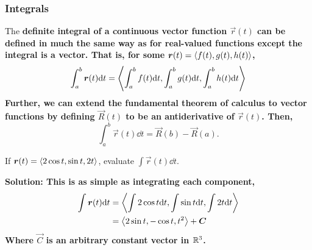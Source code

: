 \subsubsection{Integrals}
The \bf{definite integral} of a continuous vector function \(\vec r(t)\) can be defined in much the same way as for real-valued functions except the integral is a vector. That is, for some \(\boldsymbol{r}(t) = \left\langle f(t), g(t), h(t)\right\rangle\),
\[ \int_a^b\boldsymbol{r}(t)\dd t = \left\langle\int_a^bf(t)\dd t, \int_a^b g(t)\dd t, \int_a^b h(t)\dd t\right\rangle \]
Further, we can extend the fundamental theorem of calculus to vector functions by defining \(\vec R(t)\) to be an antiderivative of \(\vec r(t)\). Then,
\[ \int_a^b\vec r(t)\dd t = \vec R(b) - \vec R(a).\]
\begin{example}
    If \(\boldsymbol{r}(t) = \left\langle2\cos t, \sin t, 2t\right\rangle\), evaluate \(\int \vec r(t)\dd t\).\par\bf{Solution: }This is as simple as integrating each component,
    \begin{align*}
        \int \boldsymbol{r}(t)\dd t &= \left\langle\int 2\cos t \dd t, \int \sin t \dd t, \int 2t\dd t\right\rangle \\
        &= \left\langle 2\sin t, -\cos t, t^2\right\rangle + \boldsymbol{C}
    \end{align*}
    Where \(\vec C\) is an arbitrary constant vector in \(\mathbb{R}^3\).
\end{example}
